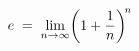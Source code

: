 \documentclass[preview]{standalone}
\begin{document}
\begin{align*}
\special{dvisvgm:raw <g id='unique000'>}e \;=\; \lim_{n \to \infty}\!\left(1 + \frac{1}{n}\right)^{\!n}\special{dvisvgm:raw </g>}
\end{align*}
\end{document}
